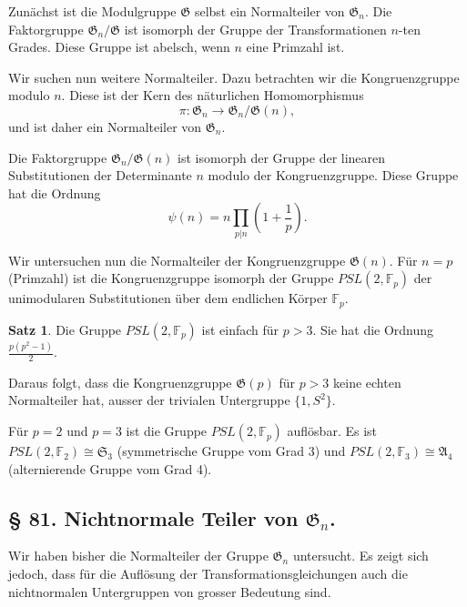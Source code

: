 \documentclass[12pt,a4paper]{article}
\theoremstyle{definition}
\newtheorem*{satz}{Satz}
\begin{document}
Zun\"achst ist die Modulgruppe $\mathfrak{G}$ selbst ein Normalteiler
von $\mathfrak{G}_n$. Die Faktorgruppe $\mathfrak{G}_n/\mathfrak{G}$ ist isomorph der Gruppe
der Transformationen $n$-ten Grades. Diese Gruppe ist abelsch,
wenn $n$ eine Primzahl ist.

Wir suchen nun weitere Normalteiler. Dazu betrachten wir
die Kongruenzgruppe modulo $n$. Diese ist der Kern des
n\"aturlichen Homomorphismus
\begin{equation}\tag{2}
\pi: \mathfrak{G}_n \to \mathfrak{G}_n/\mathfrak{G}(n),
\end{equation}
und ist daher ein Normalteiler von $\mathfrak{G}_n$.

Die Faktorgruppe $\mathfrak{G}_n/\mathfrak{G}(n)$ ist isomorph der Gruppe der
linearen Substitutionen der Determinante $n$ modulo der
Kongruenzgruppe. Diese Gruppe hat die Ordnung
\begin{equation}\tag{3}
\psi(n) = n \prod_{p|n} \left(1 + \frac{1}{p}\right).
\end{equation}

Wir untersuchen nun die Normalteiler der Kongruenzgruppe
$\mathfrak{G}(n)$. F\"ur $n = p$ (Primzahl) ist die Kongruenzgruppe
isomorph der Gruppe $PSL(2, \mathbb{F}_p)$ der unimodularen
Substitutionen \"uber dem endlichen K\"orper $\mathbb{F}_p$.

\begin{satz}
Die Gruppe $PSL(2, \mathbb{F}_p)$ ist einfach f\"ur $p > 3$. Sie hat
die Ordnung $\frac{p(p^2-1)}{2}$.
\end{satz}

Daraus folgt, dass die Kongruenzgruppe $\mathfrak{G}(p)$ f\"ur
$p > 3$ keine echten Normalteiler hat, ausser der trivialen
Untergruppe $\{1, S^2\}$.

F\"ur $p = 2$ und $p = 3$ ist die Gruppe $PSL(2, \mathbb{F}_p)$
aufl\"osbar. Es ist $PSL(2, \mathbb{F}_2) \cong \mathfrak{S}_3$ (symmetrische
Gruppe vom Grad 3) und $PSL(2, \mathbb{F}_3) \cong \mathfrak{A}_4$
(alternierende Gruppe vom Grad 4).

\subsection*{\S{} 81. Nichtnormale Teiler von $\mathfrak{G}_n$.}

Wir haben bisher die Normalteiler der Gruppe $\mathfrak{G}_n$
untersucht. Es zeigt sich jedoch, dass f\"ur die Aufl\"osung der
Transformationsgleichungen auch die nichtnormalen Untergruppen
von grosser Bedeutung sind.
\end{document}

